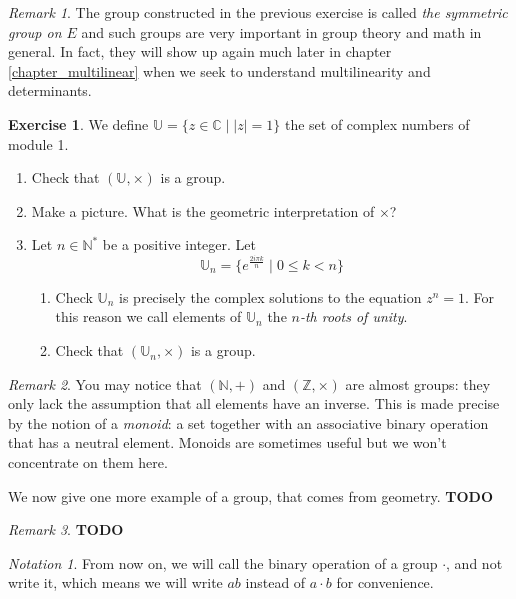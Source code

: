 \documentclass{book}
\newcommand{\N}{\mathbb{N}}
\newcommand{\Z}{\mathbb{Z}}
\newcommand{\C}{\mathbb{C}}
\newcommand{\U}{\mathbb{U}}
\newcommand{\todo}{\textbf{TODO}}
\theoremstyle{plain}
\theoremstyle{definition}
\newtheorem{exercise}{Exercise}[section]
\theoremstyle{remark}
\newtheorem*{remark}{Remark}
\newtheorem*{notation}{Notation}
\begin{document}
\begin{remark}
    The group constructed in the previous exercise is called \emph{the symmetric group on $E$} and such groups are very important in group theory and math in general. In fact, they will show up again much later in chapter \hyperref[chapter_multilinear]{\ref{chapter_multilinear}} when we seek to understand multilinearity and determinants.
\end{remark}

\begin{exercise}
    We define $\U = \{z \in \C \mid |z| = 1\}$ the set of complex numbers of module 1.
    \begin{enumerate}
        \item Check that $(\U,\times)$ is a group.
        \item Make a picture. What is the geometric interpretation of $\times$?
        \item Let $n \in \N^*$ be a positive integer. Let
        \[\U_n = \{e^\frac{2i \pi k}{n} \mid 0 \le k < n\}\]
        \begin{enumerate}
            \item Check $\U_n$ is precisely the complex solutions to the equation $z^n = 1$. For this reason we call elements of $\U_n$ the \emph{$n$-th roots of unity}.
            \item Check that $(\U_n, \times)$ is a group.
        \end{enumerate}
    \end{enumerate}
\end{exercise}

\begin{remark}
    You may notice that $(\N,+)$ and $(\Z,\times)$ are almost groups: they only lack the assumption that all elements have an inverse. This is made precise by the notion of a \emph{monoid}: a set together with an associative binary operation that has a neutral element. Monoids are sometimes useful but we won't concentrate on them here.
\end{remark}

We now give one more example of a group, that comes from geometry.
\todo %

\begin{remark}
    \todo %
\end{remark}

\begin{notation}
    From now on, we will call the binary operation of a group $\cdot$, and not write it, which means we will write $ab$ instead of $a \cdot b$ for convenience.
\end{notation}
\end{document}
